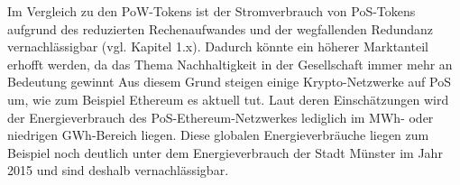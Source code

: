 Im Vergleich zu den PoW-Tokens ist der Stromverbrauch von PoS-Tokens aufgrund des reduzierten Rechenaufwandes und der wegfallenden Redundanz vernachlässigbar (vgl. Kapitel 1.x). Dadurch könnte ein höherer Marktanteil erhofft werden, da das Thema Nachhaltigkeit in der Gesellschaft immer mehr an Bedeutung gewinnt Aus diesem Grund steigen einige Krypto-Netzwerke auf PoS um, wie zum Beispiel Ethereum es aktuell tut. Laut deren Einschätzungen wird der Energieverbrauch des PoS-Ethereum-Netzwerkes lediglich im MWh- oder niedrigen GWh-Bereich liegen. Diese globalen Energieverbräuche liegen zum Beispiel noch deutlich unter dem Energieverbrauch der Stadt Münster im Jahr 2015 und sind deshalb vernachlässigbar.